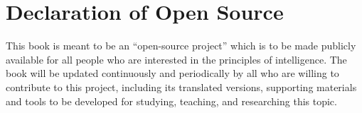 \documentclass[../../book-main.tex]{subfiles}
\begin{document}
\chapter*{Declaration of Open Source}

This book is meant to be an ``open-source project'' which is to be made publicly available for all people who are interested in the principles of intelligence. The book will be updated continuously and periodically by all who are willing to contribute to this project, including its translated versions, supporting materials and tools to be developed for studying, teaching, and researching this topic.
\end{document}
